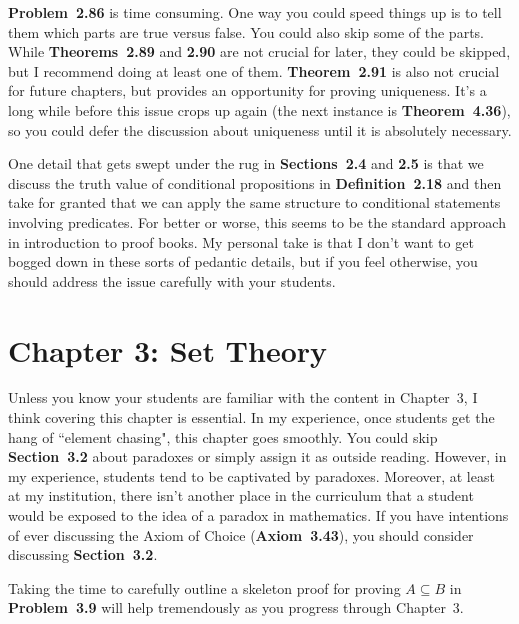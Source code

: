 \documentclass[11pt]{article}%
\newcommand{\blankline}{\pagebreak[2]\vspace{.5\baselineskip}}
\begin{document}
\blankline

\textbf{Problem~2.86} is time consuming.  One way you could speed things up is to tell them which parts are true versus false.  You could also skip some of the parts.  While \textbf{Theorems~2.89} and \textbf{2.90} are not crucial for later, they could be skipped, but I recommend doing at least one of them.  \textbf{Theorem~2.91} is also not crucial for future chapters, but provides an opportunity for proving uniqueness.  It's a long while before this issue crops up again (the next instance is \textbf{Theorem~4.36}), so you could defer the discussion about uniqueness until it is absolutely necessary. 

\blankline

One detail that gets swept under the rug in \textbf{Sections~2.4} and \textbf{2.5} is that we discuss the truth value of conditional propositions in \textbf{Definition~2.18} and then take for granted that we can apply the same structure to conditional statements involving predicates. For better or worse, this seems to be the standard approach in introduction to proof books.  My personal take is that I don't want to get bogged down in these sorts of pedantic details, but if you feel otherwise, you should address the issue carefully with your students.


\section*{Chapter 3: Set Theory}

Unless you know your students are familiar with the content in Chapter~3, I think covering this chapter is essential.  In my experience, once students get the hang of ``element chasing", this chapter goes smoothly.  You could skip \textbf{Section~3.2} about paradoxes or simply assign it as outside reading.  However, in my experience, students tend to be captivated by paradoxes.  Moreover, at least at my institution, there isn't another place in the curriculum that a student would be exposed to the idea of a paradox in mathematics.  If you have intentions of ever discussing the Axiom of Choice (\textbf{Axiom~3.43}), you should consider discussing \textbf{Section~3.2}.

\blankline

Taking the time to carefully outline a skeleton proof for proving $A\subseteq B$ in \textbf{Problem~3.9} will help tremendously as you progress through Chapter~3. 

\blankline
\end{document}
